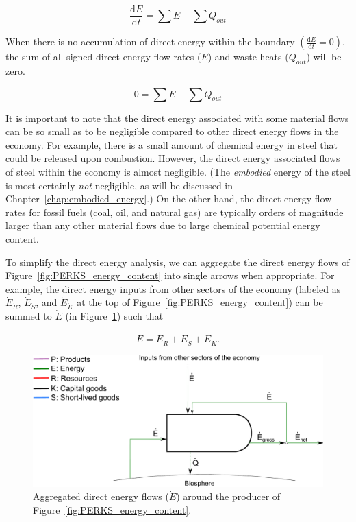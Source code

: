 \begin{equation} \label{eq:First_Law_with_accumulation}
	\frac{\mathrm{d}E}{\mathrm{d}t} = \sum \dot{E} - \sum \dot{Q}_{out}
\end{equation}

When there is no accumulation of direct energy within the boundary
$\left( \frac{\mathrm{d}E}{\mathrm{d}t} = 0 \right)$, the sum of all 
signed direct energy flow rates ($\dot{E}$) 
and waste heats ($\dot{Q}_{out}$) will be zero.

\begin{equation} \label{eq:First_Law_no_accumulation}
	0 = \sum \dot{E} - \sum \dot{Q}_{out}
\end{equation}

It is important to note that the direct energy associated with some material flows can
be so small as to be negligible compared to other direct energy flows in the economy.
For example, there is a small amount of chemical energy in steel that could be
released upon combustion. 
However, the direct energy associated flows of steel within the economy
is almost negligible. (The \emph{embodied} energy of the steel is most certainly
\emph{not} negligible, as will be discussed in Chapter~\ref{chap:embodied_energy}.)
On the other hand, the direct energy flow rates for 
fossil fuels
(coal, oil, and natural gas)
are typically orders of magnitude larger than any other 
material flows due to large chemical potential energy content.

To simplify the direct energy analysis, 
we can aggregate the direct energy flows of Figure~\ref{fig:PERKS_energy_content}
into single arrows when appropriate. 
For example, the direct energy inputs from other sectors of the economy
(labeled as $\dot{E}_{\dot{R}}$, $\dot{E}_{\dot{S}}$, and $\dot{E}_{\dot{K}}$ 
at the top of Figure~\ref{fig:PERKS_energy_content}) can be summed to $\dot{E}$ 
(in Figure~\ref{fig:PERKS_energy}) such that

\begin{equation} \label{eq:direct_energy_aggregation}
	\dot{E} 
	= \dot{E}_{\dot{R}} 
	+ \dot{E}_{\dot{S}} 
	+ \dot{E}_{\dot{K}}.
\end{equation}

\begin{figure}[!ht]
\centering
\includegraphics[width=0.8\linewidth]{Part_1/Chapter_Energy/images/PERKS_basic_unit_energy.pdf}
\caption[Aggregated direct energy flows for a single sector]{Aggregated direct energy flows ($\dot{E}$) around 
the producer of Figure~\ref{fig:PERKS_energy_content}.}
\label{fig:PERKS_energy}
\end{figure}


